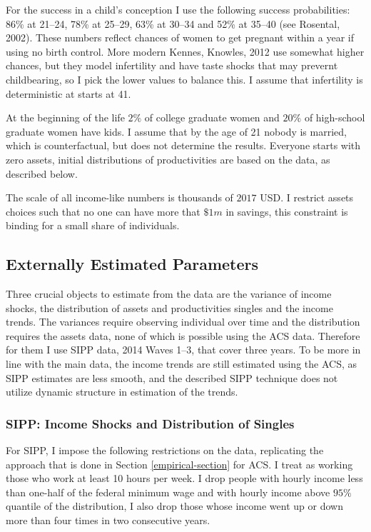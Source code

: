 \documentclass[12pt,letter]{article}
\begin{document}
For the success in a child's conception I use the following success probabilities: 86\% at 21--24, 78\% at 25--29, 63\% at 30--34 and 52\% at 35--40 (see Rosental, 2002\nocite{rosenthal2002fertility}). These numbers reflect chances of women to get pregnant within a year if using no birth control. More modern Kennes, Knowles, 2012\nocite{kennes2012} use somewhat higher chances, but they model infertility and have taste shocks that may prevernt childbearing, so I pick the lower values to balance this. I assume that infertility is deterministic at starts at 41.

At the beginning of the life $2\%$ of college graduate women and $20\%$ of high-school graduate women have kids. I assume that by the age of 21 nobody is married, which is counterfactual, but does not determine the results. Everyone starts with zero assets, initial distributions of productivities are based on the data, as described below. 

The scale of all income-like numbers is thousands of $2017$ USD. I restrict assets choices such that no one can have more that $\$ 1m$ in savings, this constraint is binding for a small share of individuals. 

\subsection{Externally Estimated Parameters}

Three crucial objects to estimate from the data are the variance of income shocks, the distribution of assets and productivities singles and the income trends. The variances require observing individual over time and the distribution requires the assets data, none of which is possible using the ACS data. Therefore for them I use SIPP data, 2014 Waves 1--3, that cover three years. To be more in line with the main data, the income trends are still estimated using the ACS, as SIPP estimates are less smooth, and the described SIPP technique does not utilize dynamic structure in estimation of the trends.

\subsubsection{SIPP: Income Shocks and Distribution of Singles}
For SIPP, I impose the following restrictions on the data, replicating the approach that is done in Section \ref{empirical-section} for ACS. I treat as working those who work at least 10 hours per week. I drop people with hourly income less than one-half of the federal minimum wage and with hourly income above $95\%$ quantile of the distribution, I also drop those whose income went up or down more than four times in two consecutive years.
\end{document}
